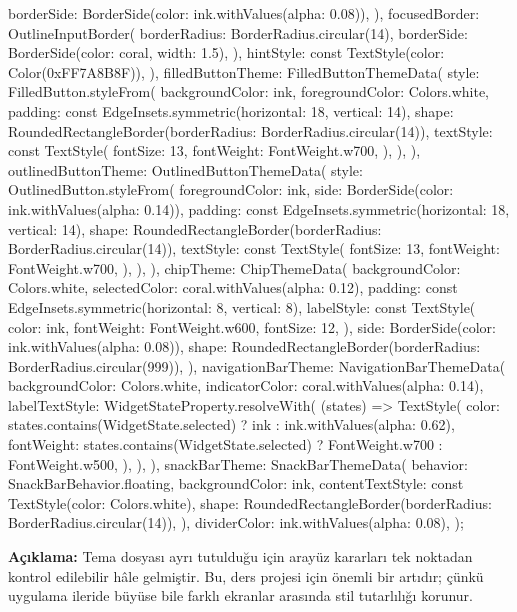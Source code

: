 \documentclass[11pt,a4paper]{article}
\begin{document}
\begin{codeblock}
{        borderSide: BorderSide(color: ink.withValues(alpha: 0.08)),
      ),
      focusedBorder: OutlineInputBorder(
        borderRadius: BorderRadius.circular(14),
        borderSide: BorderSide(color: coral, width: 1.5),
      ),
      hintStyle: const TextStyle(color: Color(0xFF7A8B8F)),
    ),
    filledButtonTheme: FilledButtonThemeData(
      style: FilledButton.styleFrom(
        backgroundColor: ink,
        foregroundColor: Colors.white,
        padding: const EdgeInsets.symmetric(horizontal: 18, vertical: 14),
        shape: RoundedRectangleBorder(borderRadius: BorderRadius.circular(14)),
        textStyle: const TextStyle(
          fontSize: 13,
          fontWeight: FontWeight.w700,
        ),
      ),
    ),
    outlinedButtonTheme: OutlinedButtonThemeData(
      style: OutlinedButton.styleFrom(
        foregroundColor: ink,
        side: BorderSide(color: ink.withValues(alpha: 0.14)),
        padding: const EdgeInsets.symmetric(horizontal: 18, vertical: 14),
        shape: RoundedRectangleBorder(borderRadius: BorderRadius.circular(14)),
        textStyle: const TextStyle(
          fontSize: 13,
          fontWeight: FontWeight.w700,
        ),
      ),
    ),
    chipTheme: ChipThemeData(
      backgroundColor: Colors.white,
      selectedColor: coral.withValues(alpha: 0.12),
      padding: const EdgeInsets.symmetric(horizontal: 8, vertical: 8),
      labelStyle: const TextStyle(
        color: ink,
        fontWeight: FontWeight.w600,
        fontSize: 12,
      ),
      side: BorderSide(color: ink.withValues(alpha: 0.08)),
      shape: RoundedRectangleBorder(borderRadius: BorderRadius.circular(999)),
    ),
    navigationBarTheme: NavigationBarThemeData(
      backgroundColor: Colors.white,
      indicatorColor: coral.withValues(alpha: 0.14),
      labelTextStyle: WidgetStateProperty.resolveWith(
        (states) => TextStyle(
          color: states.contains(WidgetState.selected)
              ? ink
              : ink.withValues(alpha: 0.62),
          fontWeight: states.contains(WidgetState.selected)
              ? FontWeight.w700
              : FontWeight.w500,
        ),
      ),
    ),
    snackBarTheme: SnackBarThemeData(
      behavior: SnackBarBehavior.floating,
      backgroundColor: ink,
      contentTextStyle: const TextStyle(color: Colors.white),
      shape: RoundedRectangleBorder(borderRadius: BorderRadius.circular(14)),
    ),
    dividerColor: ink.withValues(alpha: 0.08),
  );
}
\end{codeblock}

\textbf{Açıklama:} Tema dosyası ayrı tutulduğu için arayüz kararları tek noktadan kontrol edilebilir hâle gelmiştir. Bu, ders projesi için önemli bir artıdır; çünkü uygulama ileride büyüse bile farklı ekranlar arasında stil tutarlılığı korunur.
\end{document}
